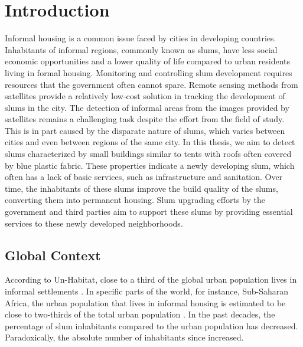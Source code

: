 \section{Introduction}

Informal housing is a common issue faced by cities in developing countries. Inhabitants of informal regions, commonly known as slums, have less social economic opportunities and a lower quality of life compared to urban residents living in formal housing. Monitoring and controlling slum development requires resources that the government often cannot spare. Remote sensing methods from satellites provide a relatively low-cost solution in tracking the development of slums in the city. The detection of informal areas from the images provided by satellites remains a challenging task despite the effort from the field of study. This is in part caused by the disparate nature of slums, which varies between cities and even between regions of the same city. In this thesis, we aim to detect slums characterized by small buildings similar to tents with roofs often covered by blue plastic fabric. These properties indicate a newly developing slum, which often has a lack of basic services, such as infrastructure and sanitation. Over time, the inhabitants of these slums improve the build quality of the slums, converting them into permanent housing. Slum upgrading efforts by the government and third parties aim to support these slums by providing essential services to these newly developed neighborhoods.


\subsection{Global Context}
According to Un-Habitat, close to a third of the global urban population lives in informal settlements \cite{2016state}. In specific parts of the world, for instance, Sub-Saharan Africa, the urban population that lives in informal housing is estimated to be close to two-thirds of the total urban population \cite{un2013planning}. In the past decades, the percentage of slum inhabitants compared to the urban population has decreased. Paradoxically, the absolute number of inhabitants since increased\cite{2016state}.

